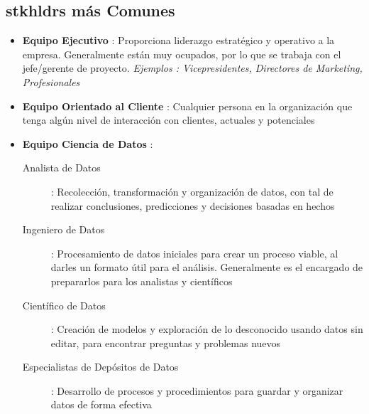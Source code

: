 \subsection{\gls{stkhldrs} más Comunes}
\begin{itemize}
    \item {\textbf{Equipo Ejecutivo} : Proporciona liderazgo estratégico y operativo a la empresa. Generalmente están muy ocupados, por lo que se trabaja con el jefe/gerente de proyecto. \textit{Ejemplos : Vicepresidentes, Directores de Marketing, Profesionales}}
    \item {\textbf{Equipo Orientado al Cliente} : Cualquier persona en la organización que tenga algún nivel de interacción con clientes, actuales y potenciales}
    \item {\textbf{Equipo Ciencia de Datos} : 
    \begin{description}
        \item [Analista de Datos]{: Recolección, transformación y organización de datos, con tal de realizar conclusiones, predicciones y decisiones basadas en hechos}
        \item [Ingeniero de Datos]{ : Procesamiento de datos iniciales para crear un proceso viable, al darles un formato útil para el análisis. Generalmente es el encargado de prepararlos para los analistas y científicos}
        \item [Científico de Datos]{ : Creación de modelos y exploración de lo desconocido usando datos sin editar, para encontrar preguntas y problemas nuevos}
        \item [Especialistas de Depósitos de Datos]{ : Desarrollo de procesos y procedimientos para guardar y organizar datos de forma efectiva}
    \end{description}}
\end{itemize}

\newpage